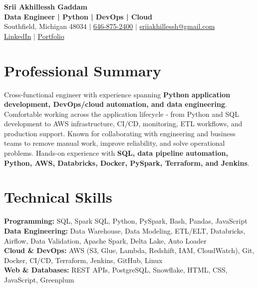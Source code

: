 \documentclass[letterpaper,10pt]{article}
\begin{document}
\fontsize{9.35pt}{10.45pt}\selectfont

\begin{center}
    {\LARGE \textbf{Srii Akhillessh Gaddam}} \\[-1pt]
    \textbf{Data Engineer | Python | DevOps | Cloud} \\[2pt]
    Southfield, Michigan 48034 $|$
    \href{tel:6468752400}{646-875-2400} $|$
    \href{mailto:sriiakhillessh@gmail.com}{sriiakhillessh@gmail.com} \\[1pt]
    \href{https://www.linkedin.com/in/srii-akhiilessh-gaddam-b48668191/}{LinkedIn} $|$
    \href{https://sriiakhillesshg.github.io/portfolio/}{Portfolio}
\end{center}
\vspace{-8pt}

\section{Professional Summary}
\small{Cross-functional engineer with experience spanning \textbf{Python application development, DevOps/cloud automation, and data engineering}. Comfortable working across the application lifecycle - from Python and SQL development to AWS infrastructure, CI/CD, monitoring, ETL workflows, and production support. Known for collaborating with engineering and business teams to remove manual work, improve reliability, and solve operational problems. Hands-on experience with \textbf{SQL, data pipeline automation, Python, AWS, Databricks, Docker, PySpark, Terraform, and Jenkins}.}

\section{Technical Skills}
\small{
\textbf{Programming:} SQL, Spark SQL, Python, PySpark, Bash, Pandas, JavaScript \\
\textbf{Data Engineering:} Data Warehouse, Data Modeling, ETL/ELT, Databricks, Airflow, Data Validation, Apache Spark, Delta Lake, Auto Loader \\
\textbf{Cloud \& DevOps:} AWS (S3, Glue, Lambda, Redshift, IAM, CloudWatch), Git, Docker, CI/CD, Terraform, Jenkins, GitHub, Linux \\
\textbf{Web \& Databases:} REST APIs, PostgreSQL, Snowflake, HTML, CSS, JavaScript, Greenplum
}
\end{document}
